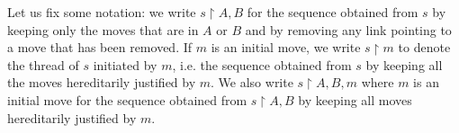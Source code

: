 \begin{rem}
%
%
%
%
\end{rem}

Let us fix some notation: we write $s\upharpoonright A,B$ for the
sequence obtained from $s$ by keeping only the moves that are in $A$ or $B$ and by removing any link pointing to a move that
has been removed.
If $m$ is an initial move, we write $s \upharpoonright m$ to
denote the thread of $s$ initiated by $m$, i.e. the sequence obtained from $s$ by keeping all the moves
hereditarily justified by $m$.
We also write $s \upharpoonright A,B,m$ where $m$ is an initial move
for the sequence obtained from $s \upharpoonright A,B$ by keeping
all moves hereditarily justified by $m$.



